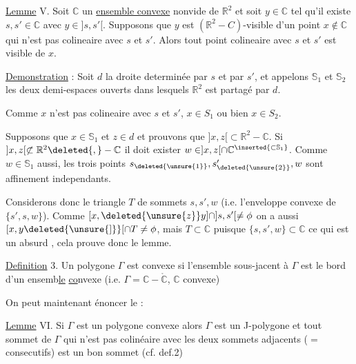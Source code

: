 \deleted{$]z,x]\subset\mathbb{R}^{2}-\mathbb{C}$, c.q.f.d.}

\uline{Lemme} V. Soit $\mathbb{C}$ un \uline{ensemble convexe} nonvide de $\mathbb{R}^{2}$ et soit $y\in\mathbb{C}$ tel qu'il existe $s,s'\in\mathbb{C}$ avec $y\in ]s,s'[$. Supposons que $y$ est $(\mathbb{R}^{2}-C)$-visible d'un point $x\notin\mathbb{C}$ qui n'est pas colineaire avec $s$ et $s'$. Alors tout point colineaire avec $s$ et $s'$ est visible de $x$.


\uline{Demonstration} : Soit $d$ la droite determinée par $s$ et par $s'$, et appelons $\mathbb{S}_{1}$ et $\mathbb{S}_{2}$ les deux demi-espaces ouverts dans lesquels $\mathbb{R}^{2}$ est partagé par $d$.

Comme $x$ n'est pas colineaire avec $s$ et $s'$,  $x\in S_{1}$ ou bien $x\in S_{2}$.

Supposons que $x\in\mathbb{S}_{1}$ et $z\in d$ et prouvons que $]x,z[\subset\mathbb{R}^{2}-\mathbb{C}$. Si $]x,z[\not\subset\mathbb{R}^{2}\deleted{,}-\mathbb{C}$ il doit exister $w\in ]x,z[\cap\mathbb{C}{}^{\inserted{\subset\mathbb{S}_{1}}}$. Comme $w\in\mathbb{S}_{1}$ aussi, les trois points $s_{\deleted{\unsure{1}}},s_{\deleted{\unsure{2}}}',w$ sont affinement independants.

Considerons donc le triangle $T$ de sommets $s,s',w$ (i.e. l'enveloppe convexe de $\{s',s,w\}$). Comme $[x,\deleted{\unsure{z}}y]\cap ]s,s'[\ne\phi$ on a aussi $[x,y\deleted{\unsure{]}}[\cap T\ne\phi$, mais $T\subset\mathbb{C}$ puisque $\{s,s',w\}\subset\mathbb{C}$ ce qui est un absurd \inserted{puisque on suppose $[x,y[\cap\mathbb{C}=\phi$}, cela prouve donc le lemme.

\uline{Definition} 3. Un polygone $\Gamma$ est  convexe  si l'ensemble sous-jacent à $\Gamma$ est le bord d'un ensemb\uline{le} \uline{co}nvexe (i.e. $\Gamma=\mathbb{C}-\mathring{\mathbb{C}}$, $\mathbb{C}$ convexe)

\margin{$\bullet$}
On peut maintenant énoncer le :

\uline{Lemme} VI. Si $\Gamma$ est un polygone convexe alors $\Gamma$ est un J-polygone et tout sommet de $\Gamma$  qui n'est pas colinéaire avec les deux sommets adjacents ($=$ consecutifs) est un bon sommet (cf. def.2)
